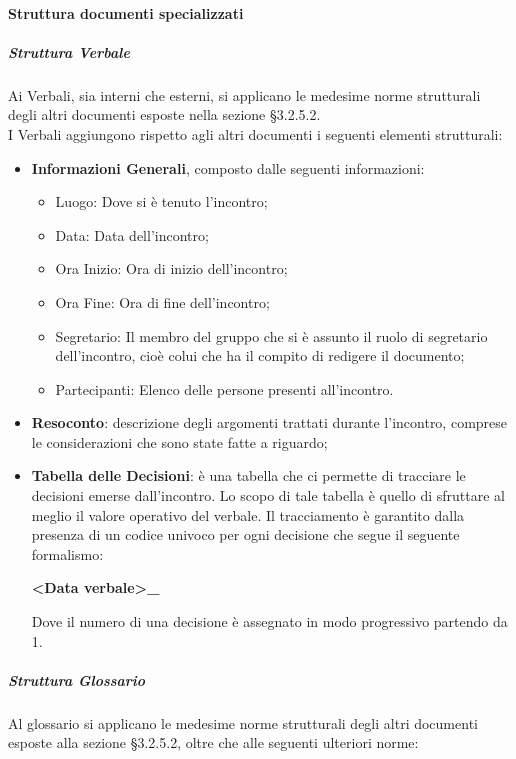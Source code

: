 			\paragraph{Struttura documenti specializzati}
				\subparagraph{Struttura Verbale}
					Ai Verbali, sia interni che esterni, si applicano le medesime norme strutturali degli altri documenti esposte nella sezione §3.2.5.2. \\
					I Verbali aggiungono rispetto agli altri documenti i seguenti elementi strutturali:
					\begin{itemize}
						\item\textbf{Informazioni Generali}, composto dalle seguenti informazioni:
							\begin{itemize}
								\item Luogo: Dove si è tenuto l’incontro;
								\item Data: Data dell’incontro;
								\item Ora Inizio: Ora di inizio dell’incontro;
								\item Ora Fine: Ora di fine dell’incontro;
								\item Segretario: Il membro del gruppo che si è assunto il ruolo di segretario dell’incontro, cioè colui che ha il compito di redigere il documento;
								\item Partecipanti: Elenco delle persone presenti all’incontro.
							\end{itemize}
						\item\textbf{Resoconto}: descrizione degli argomenti trattati durante l’incontro, comprese le considerazioni che sono state fatte a riguardo;
						\item\textbf{Tabella delle Decisioni}: è una tabella che ci permette di tracciare le decisioni emerse dall’incontro. Lo scopo di tale tabella è quello di sfruttare al meglio il valore operativo del verbale. Il tracciamento è garantito dalla presenza di un codice univoco per ogni decisione che segue il seguente formalismo: \\
							\begin{center}
								\textbf{<Data verbale>\_<Numero decisione>}
							\end{center}
							Dove il numero di una decisione è assegnato in modo progressivo partendo da 1.
					\end{itemize}
				\subparagraph{Struttura Glossario}
					Al glossario si applicano le medesime norme strutturali degli altri documenti esposte alla sezione §3.2.5.2, oltre che alle seguenti ulteriori norme:\\
